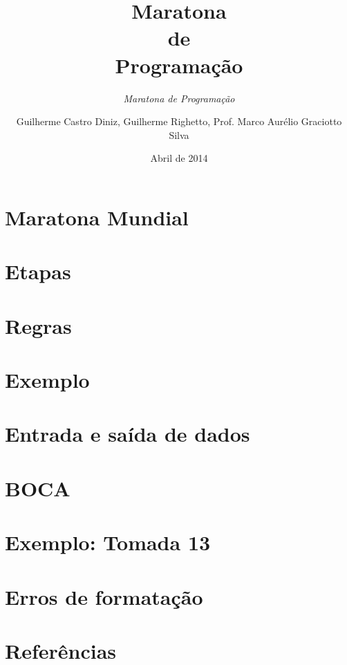 \documentclass[utf8, usepdftitle=false, svgnames, color={table,
fixpdftex, hyperref, fixinclude, xcdraw}, t, brazil]{beamer}
\title{Maratona\\de\\Programação}
\subtitle{\textit{Maratona de Programação}}
\author[UTFPR-CM]{Guilherme Castro Diniz, Guilherme Righetto, Prof. Marco Aurélio Graciotto Silva}
\date[]{Abril de 2014}
\begin{document}
 \section{Maratona Mundial}
 
 
 \section{Etapas}
 
 
 \section{Regras}
 
 
 \section{Exemplo}
 

 \section{Entrada e saída de dados}
 
 
 \section{BOCA}
 
 
 \section{Exemplo: Tomada 13}
 
 
 \section{Erros de formatação}
 
 
 \section{Referências}
 
\end{document}
